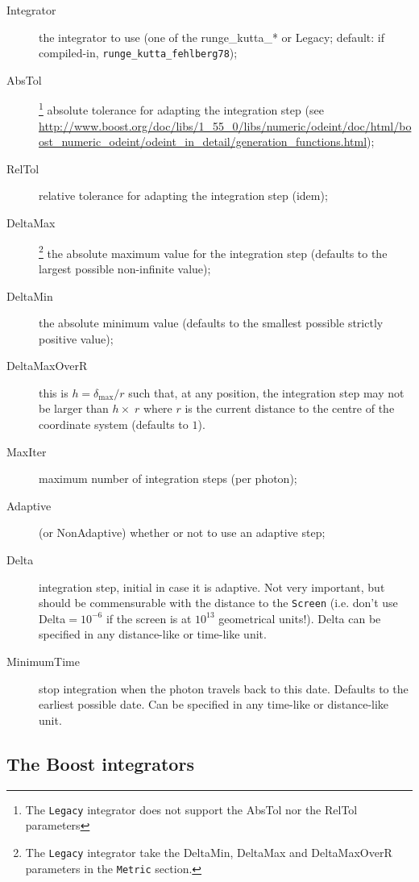 \documentclass[a4paper,12pt]{article}
\begin{document}
\begin{description}
\item[Integrator] the integrator to use (one of the runge\_kutta\_* or
  Legacy; default: if compiled-in, \texttt{runge\_kutta\_fehlberg78});
\item[AbsTol]\footnote{\label{note:abstol}The \texttt{Legacy}
    integrator does not support the AbsTol nor the RelTol parameters}
  absolute tolerance for adapting the integration step (see
  \url{http://www.boost.org/doc/libs/1_55_0/libs/numeric/odeint/doc/html/boost_numeric_odeint/odeint_in_detail/generation_functions.html});
\item[RelTol]\footnotemark[\value{footnote}] relative tolerance for
  adapting the integration step (idem);
\item[DeltaMax]\footnote{The \texttt{Legacy} integrator take the
    DeltaMin, DeltaMax and DeltaMaxOverR parameters in the
    \texttt{Metric} section.} the absolute maximum value for the
  integration step (defaults to the largest possible non-infinite
  value);
\item[DeltaMin]\footnotemark[\value{footnote}] the absolute minimum value (defaults to the smallest
  possible strictly positive value);
\item[DeltaMaxOverR]\footnotemark[\value{footnote}] this is $h=\delta_\text{max}/r$ such that, at any
  position, the integration step may not be larger than $h\times\;r$
  where $r$ is the current distance to the centre of the coordinate
  system (defaults to $1$).
\item[MaxIter] maximum number of integration steps (per photon);
\item[Adaptive] (or NonAdaptive) whether or not to use an adaptive step;
\item[Delta] integration step, initial in case it is adaptive. Not
  very important, but should be commensurable with the distance to the
  \texttt{Screen} (i.e. don't use Delta$=10^{-6}$ if the screen is at
  $10^{13}$ geometrical units!). Delta can be specified in any
  distance-like or time-like unit.
\item[MinimumTime] stop integration when the photon travels back to
  this date. Defaults to the earliest possible date. Can be specified
  in any time-like or distance-like unit.
\end{description}

\subsection{The Boost integrators}
\end{document}
